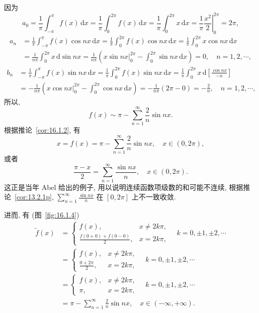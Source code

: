 \begin{solution}
因为
\[
  a_{0}=\frac{1}{\pi}\int_{-\pi}^{\pi}f(x)\,\mathrm{d}x=\frac{1}{\pi}\int_{0}^{2\pi}f(x)\,\mathrm{d}x=\frac{1}{\pi}\int_{0}^{2\pi}x\,\mathrm{d}x=\left.\frac{1}{\pi}\frac{x^{2}}{2}\right|_{0}^{2\pi}=2\pi,
\]
\[
  \begin{aligned}
    a_{n}&=\frac{1}{\pi}\int_{-\pi}^{\pi}f(x)\cos nx\,\mathrm{d}x=\frac{1}{\pi}\int_{0}^{2\pi}f(x)\cos nx\,\mathrm{d}x=\frac{1}{\pi}\int_{0}^{2\pi}x\cos nx\,\mathrm{d}x\\
    &=\frac{1}{n\pi}\int_{0}^{2\pi}x\,\mathrm{d}\sin nx=\frac{1}{n\pi}\left(\left.x\sin nx\right|_{0}^{2\pi}-\int_{0}^{2\pi}\sin nx\,\mathrm{d}x\right)=0,\quad n=1,2,\cdots,
  \end{aligned}
\]
\[
  \begin{aligned}
    b_{n}&=\frac{1}{\pi}\int_{-\pi}^{\pi}f(x)\sin nx\,\mathrm{d}x=\frac{1}{\pi}\int_{0}^{2\pi}f(x)\sin nx\,\mathrm{d}x=\frac{1}{\pi}\int_{0}^{2\pi}x\,\mathrm{d}\left[\frac{\cos nx}{-n}\right]\\
    &=-\frac{1}{n\pi}\left(\left.x\cos nx\right|_{0}^{2\pi}-\int_{0}^{2\pi}\cos nx\,\mathrm{d}x\right)=-\frac{1}{n\pi}(2\pi-0)=-\frac{2}{n},\quad n=1,2,\cdots,
  \end{aligned}
\]
所以,
\[
  f(x)\sim\pi-\sum_{n=1}^{\infty}\frac{2}{n}\sin nx.
\]
根据推论~\ref{cor:16.1.2}, 有
\[
  x=f(x)=\pi-\sum_{n=1}^{\infty}\frac{2}{n}\sin nx,\quad x\in(0,2\pi),
\]
或者
\[
  \frac{\pi-x}{2}=\sum_{n=1}^{\infty}\frac{\sin nx}{n},\quad x\in(0,2\pi).
\]
这正是当年 Abel 给出的例子, 用以说明连续函数项级数的和可能不连续, 根据推论~\ref{cor:13.2.1p}, $\displaystyle\sum_{n=1}^{\infty}\frac{\sin nx}{n}$ 在 $[0,2\pi]$ 上不一致收敛.

进而, 有 (图~\ref{fig:16.1.4})
\[
  \begin{aligned}
    \tilde{f}(x)&=\begin{cases}
      f(x), & x\neq 2k\pi,\\
      \displaystyle\frac{f(0+0)+f(0-0)}{2}, & x=2k\pi,
\end{cases}\quad k=0,\pm 1,\pm 2,\cdots\\
    &=\begin{cases}
      f(x), & x\neq 2k\pi,\\
      \displaystyle\frac{0+2\pi}{2}, & x=2k\pi,
\end{cases}\quad k=0,\pm 1,\pm 2,\cdots\\
    &=\begin{cases}
      f(x), & x\neq 2k\pi,\\
      \pi, & x=2k\pi,
\end{cases}\quad k=0,\pm 1,\pm 2,\cdots\\
    &=\pi-\sum_{n=1}^{\infty}\frac{2}{n}\sin nx,\quad x\in(-\infty,+\infty).
  \end{aligned}
\]


\end{solution}
